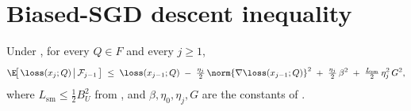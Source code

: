\section{Biased-SGD descent inequality}
\label{sec:descent_inequality}

\begin{lemma}\label{lem:descent_inequality}
Under
,
for every $Q \in F$ and every $j \ge 1$,
\begin{align}\label{eq:descent_inequality}
   \E\!\bigl[\, \loss(x_j; Q) \,\big|\, \mathcal F_{j-1} \,\bigr]
   \;\le\;
   \loss(x_{j-1}; Q)
   \;-\; \tfrac{\eta_j}{2}\, \norm{\nabla \loss(x_{j-1}; Q)}^2
   \;+\; \tfrac{\eta_j}{2}\, \beta^2
   \;+\; \tfrac{L_{\mathrm{sm}}}{2}\, \eta_j^2\, G^2,
\end{align}
where $L_{\mathrm{sm}} \le \tfrac{1}{2} B_U^2$ from
, and $\beta, \eta_0, \eta_j, G$ are the constants of
.
\end{lemma}

